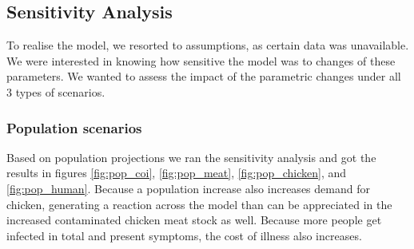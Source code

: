 \newpage 
\subsection{Sensitivity Analysis}
To realise the model, we resorted to assumptions, as certain data was unavailable. We were interested in knowing how sensitive the model was to changes of these parameters. We wanted to assess the impact of the parametric changes under all 3 types of scenarios.

\subsubsection{Population scenarios}
Based on population projections \parencite{nidi_nidi_2020} we ran the sensitivity analysis and got the results in figures \ref{fig:pop_coi}, \ref{fig:pop_meat}, \ref{fig:pop_chicken}, and \ref{fig:pop_human}. Because a population increase also increases demand for chicken, generating a reaction across the model than can be appreciated in the increased contaminated chicken meat stock as well. Because more people get infected in total and present symptoms, the cost of illness also increases.

